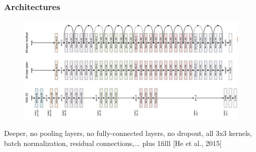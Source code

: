 \documentclass{beamer}
\newcommand{\source}[1]{\vskip0pt plus 1filll \scriptsize #1}
\begin{document}
	\begin{frame}
		\frametitle{Architectures}
		\begin{figure}[h]
			\centering
			\includegraphics[width=\textwidth]{plots/resNet.png}
		\end{figure}
		
		Deeper, no pooling layers, no fully-connected layers, no dropout, all 3x3 kernels, batch normalization, residual connections,...
		\source{[He et al., 2015]}
	\end{frame}
	
\end{document}
